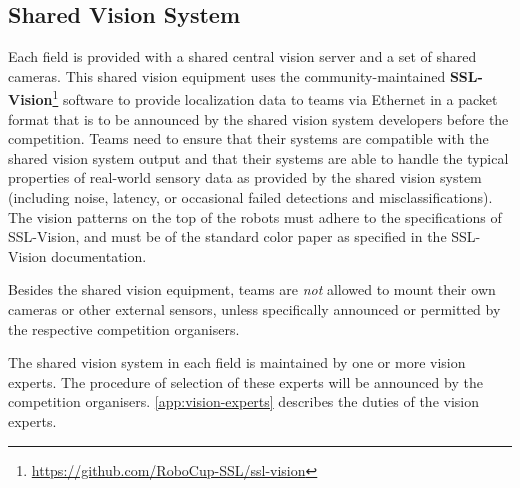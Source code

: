 \subsection{Shared Vision System}
Each field is provided with a shared central vision server and a set of shared
cameras. This shared vision equipment uses the community-maintained
\textbf{SSL-Vision}\footnote{\url{https://github.com/RoboCup-SSL/ssl-vision}} software
to provide localization data to teams via Ethernet in a packet format that is to
be announced by the shared vision system developers before the competition.
Teams need to ensure that their systems are compatible with the shared vision
system output and that their systems are able to handle the typical properties
of real-world sensory data as provided by the shared vision system (including
noise, latency, or occasional failed detections and misclassifications).
The vision patterns on the top of the robots must adhere to the
specifications of SSL-Vision, and must be of the standard color paper as
specified in the SSL-Vision documentation.

Besides the shared vision equipment, teams are \emph{not} allowed to mount
their own cameras or other external sensors, unless specifically announced or
permitted by the respective competition organisers.

The shared vision system in each field is maintained by one or more vision
experts. The procedure of selection of these experts will be announced by the
competition organisers. \autoref{app:vision-experts} describes the duties of the
vision experts.

